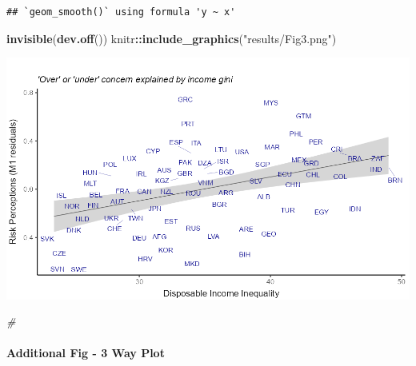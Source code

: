 \documentclass[
]{article}
\newenvironment{Shaded}{\begin{snugshade}}{\end{snugshade}}
\newcommand{\CommentTok}[1]{\textcolor[rgb]{0.56,0.35,0.01}{\textit{#1}}}
\newcommand{\KeywordTok}[1]{\textcolor[rgb]{0.13,0.29,0.53}{\textbf{#1}}}
\newcommand{\NormalTok}[1]{#1}
\newcommand{\OperatorTok}[1]{\textcolor[rgb]{0.81,0.36,0.00}{\textbf{#1}}}
\newcommand{\StringTok}[1]{\textcolor[rgb]{0.31,0.60,0.02}{#1}}
\begin{document}
\begin{verbatim}
## `geom_smooth()` using formula 'y ~ x'
\end{verbatim}

\begin{Shaded}
\begin{Highlighting}[]
\KeywordTok{invisible}\NormalTok{(}\KeywordTok{dev.off}\NormalTok{())}
\NormalTok{knitr}\OperatorTok{::}\KeywordTok{include_graphics}\NormalTok{(}\StringTok{"results/Fig3.png"}\NormalTok{)}
\end{Highlighting}
\end{Shaded}

\includegraphics[width=13.89in]{results/Fig3}

\begin{Shaded}
\begin{Highlighting}[]
\CommentTok{#    }
\end{Highlighting}
\end{Shaded}

\hypertarget{additional-fig---3-way-plot}{%
\paragraph{Additional Fig - 3 Way
Plot}\label{additional-fig---3-way-plot}}
\end{document}
